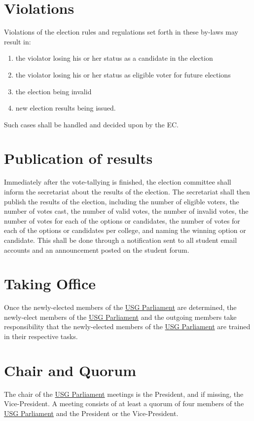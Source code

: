 \documentclass[12pt]{LaTeX_Misc/constitution}
\begin{document}
\section{Violations} 
Violations of the election rules and regulations set forth in these by-laws may result in:
\begin{enumerate}[nosep]
\item the violator losing his or her status as a candidate in the election
\item the violator losing his or her status as eligible voter for future elections
\item the election being invalid
\item new election results being issued.
\end{enumerate}
Such cases shall be handled and decided upon by the EC.

\section{Publication of results}
Immediately after the vote-tallying is finished, the election committee shall inform the secretariat about the results of the election. The secretariat shall then publish the results of the election, including the number of eligible voters, the number of votes cast, the number of valid votes, the number of invalid votes, the number of votes for each of the options or candidates, the number of votes for each of the options or candidates per college, and naming the winning option or candidate. This shall be done through a notification sent to all student email accounts and an announcement posted on the student forum.

\section{Taking Office}
Once the newly-elected members of the \hyperref[USGParliamentDef]{USG Parliament} are determined, the newly-elect members of the \hyperref[USGParliamentDef]{USG Parliament} and the outgoing members take responsibility that the newly-elected members of the \hyperref[USGParliamentDef]{USG Parliament} are trained in their respective tasks.



\section{Chair and Quorum}
The chair of the \hyperref[USGParliamentDef]{USG Parliament} meetings is the President, and if missing, the Vice-President. A meeting consists of at least a quorum of four members of the \hyperref[USGParliamentDef]{USG Parliament} and the President or the Vice-President.
\end{document}
